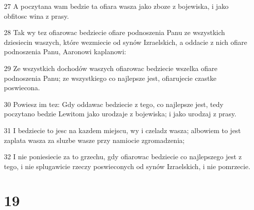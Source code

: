 \par 27 A poczytana wam bedzie ta ofiara wasza jako zboze z bojewiska, i jako obfitosc wina z prasy.
\par 28 Tak wy tez ofiarowac bedziecie ofiare podnoszenia Panu ze wszystkich dziesiecin waszych, które wezmiecie od synów Izraelskich, a oddacie z nich ofiare podnoszenia Panu, Aaronowi kaplanowi:
\par 29 Ze wszystkich dochodów waszych ofiarowac bedziecie wszelka ofiare podnoszenia Panu; ze wszystkiego co najlepsze jest, ofiarujecie czastke poswiecona.
\par 30 Powiesz im tez: Gdy oddawac bedziecie z tego, co najlepsze jest, tedy poczytano bedzie Lewitom jako urodzaje z bojewiska; i jako urodzaj z prasy.
\par 31 I bedziecie to jesc na kazdem miejscu, wy i czeladz wasza; albowiem to jest zaplata wasza za sluzbe wasze przy namiocie zgromadzenia;
\par 32 I nie poniesiecie za to grzechu, gdy ofiarowac bedziecie co najlepszego jest z tego, i nie splugawicie rzeczy poswieconych od synów Izraelskich, i nie pomrzecie.

\chapter{19}


